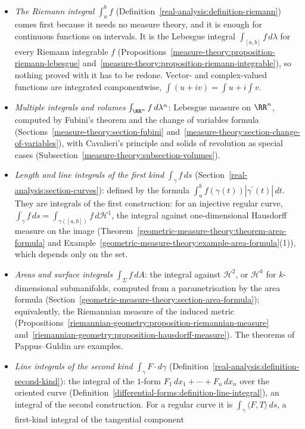 \begin{itemize}
\item \emph{The Riemann integral} $\int_a^bf$ (Definition~\ref{real-analysis:definition-riemann}) comes first because it needs no measure theory, and it is enough for continuous functions on intervals. It is the
Lebesgue integral $\int_{[a,b]}f\,d\lambda$ for every Riemann integrable $f$ (Propositions~\ref{measure-theory:proposition-riemann-lebesgue} and~\ref{measure-theory:proposition-riemann-integrable}), so nothing proved
with it has to be redone. Vector- and complex-valued functions are integrated componentwise, $\int(u + iv) = \int u + i\int v$.
\item \emph{Multiple integrals and volumes} $\int_{\RR^n}f\,d\lambda^n$: Lebesgue measure on $\RR^n$, computed by Fubini's theorem and the change of variables formula
(Sections~\ref{measure-theory:section-fubini} and~\ref{measure-theory:section-change-of-variables}), with Cavalieri's principle and solids of revolution as special cases
(Subsection~\ref{measure-theory:subsection-volumes}).
\item \emph{Length and line integrals of the first kind} $\int_\gamma f\,ds$ (Section~\ref{real-analysis:section-curves}): defined by the formula $\int_a^bf(\gamma(t))|\gamma^{\prime}(t)|\,dt$. They are integrals of the first
construction: for an injective regular curve, $\int_\gamma f\,ds = \int_{\gamma([a,b])}f\,d\mathcal{H}^1$, the integral against one-dimensional Hausdorff measure on the image (Theorem~\ref{geometric-measure-theory:theorem-area-formula} and
Example~\ref{geometric-measure-theory:example-area-formula}(1)), which depends only on the set.
\item \emph{Areas and surface integrals} $\int_\Sigma f\,dA$: the integral against $\mathcal{H}^2$, or $\mathcal{H}^k$ for $k$-dimensional submanifolds, computed from a parametrisation by the area formula
(Section~\ref{geometric-measure-theory:section-area-formula}); equivalently, the Riemannian measure of the induced metric (Propositions~\ref{riemannian-geometry:proposition-riemannian-measure}
and~\ref{riemannian-geometry:proposition-hausdorff-measure}). The theorems of Pappus--Guldin are examples.
\item \emph{Line integrals of the second kind} $\int_\gamma F \cdot d\gamma$ (Definition~\ref{real-analysis:definition-second-kind}): the integral of the $1$-form $F_1\,dx_1 + \cdots + F_n\,dx_n$ over the oriented
curve (Definition~\ref{differential-forms:definition-line-integral}), an integral of the second construction. For a regular curve it is $\int_\gamma\langle F, T\rangle\,ds$, a first-kind integral of the tangential component

\end{itemize}
